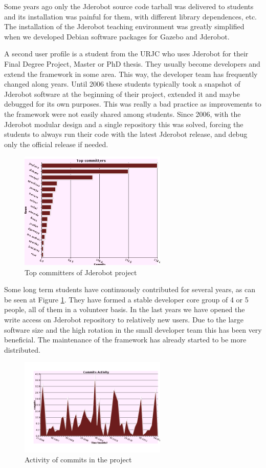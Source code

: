 \documentclass[twocolumn]{svjour3}          %
\begin{document}
Some years ago only the Jderobot source code tarball was delivered to students and its installation was painful for them, with different library dependences, etc. The installation of the Jderobot teaching environment was greatly simplified when we developed Debian software packages for Gazebo and Jderobot.

A second user profile is a student from the URJC who uses Jderobot for their Final Degree Project, Master or PhD thesis. They usually become developers and extend the framework in some area. This way, the developer team has frequently changed along years. Until 2006 these students typically took a snapshot of Jderobot software at the beginning of their project, extended it and maybe debugged for its own purposes. This was really a bad practice as improvements to the framework were not easily shared among students. Since 2006, with the Jderobot modular design and a single repository this was solved, forcing the students to always run their code with the latest Jderobot release, and debug only the official release if needed.

\begin{figure}
  \includegraphics[width=7cm]{figs/svn_top-committers.png}
\caption{Top committers of Jderobot project}
\label{fig:svn-topcommiters}
\end{figure}

Some long term students have continuously contributed for several years, as can be seen at Figure \ref{fig:svn-topcommiters}. They have formed a stable developer core group of 4 or 5 people, all of them in a volunteer basis. In the last years we have opened the write access on Jderobot repository to relatively new users. Due to the large software size and the high rotation in the small developer team this has been very beneficial. The maintenance of the framework has already started to be more distributed.

\begin{figure}
  \includegraphics[width=7cm]{figs/svn_activity.png}
\caption{Activity of commits in the project}
\label{fig:svn-activity}
\end{figure}
\end{document}
